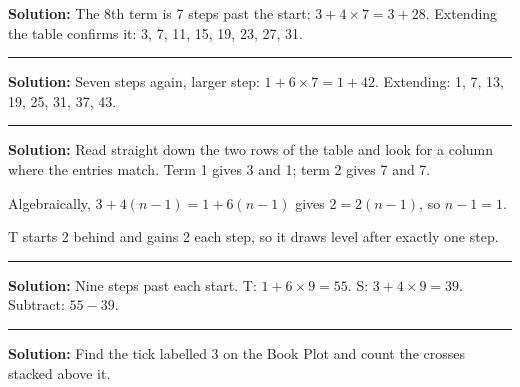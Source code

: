 \documentclass[12pt]{article}
\begin{document}




\textbf{Solution:} The 8th term is 7 steps past the start: $3 + 4 \times 7 = 3 + 28$. Extending the table confirms it: 3, 7, 11, 15, 19, 23, 27, 31. 

\vspace{0.15cm}\noindent\rule{\linewidth}{0.2pt}\vspace{0.15cm}


\textbf{Solution:} Seven steps again, larger step: $1 + 6 \times 7 = 1 + 42$. Extending: 1, 7, 13, 19, 25, 31, 37, 43. 

\vspace{0.15cm}\noindent\rule{\linewidth}{0.2pt}\vspace{0.15cm}


\textbf{Solution:} Read straight down the two rows of the table and look for a column where the entries match. Term 1 gives 3 and 1; term 2 gives 7 and 7.

Algebraically, $3 + 4(n-1) = 1 + 6(n-1)$ gives $2 = 2(n-1)$, so $n - 1 = 1$. 

T starts 2 behind and gains 2 each step, so it draws level after exactly one step.

\vspace{0.15cm}\noindent\rule{\linewidth}{0.2pt}\vspace{0.15cm}


\textbf{Solution:} Nine steps past each start. T: $1 + 6 \times 9 = 55$. S: $3 + 4 \times 9 = 39$. Subtract: $55 - 39$. 

\vspace{0.15cm}\noindent\rule{\linewidth}{0.2pt}\vspace{0.15cm}


\textbf{Solution:} Find the tick labelled 3 on the Book Plot and count the crosses stacked above it. 
\end{document}
